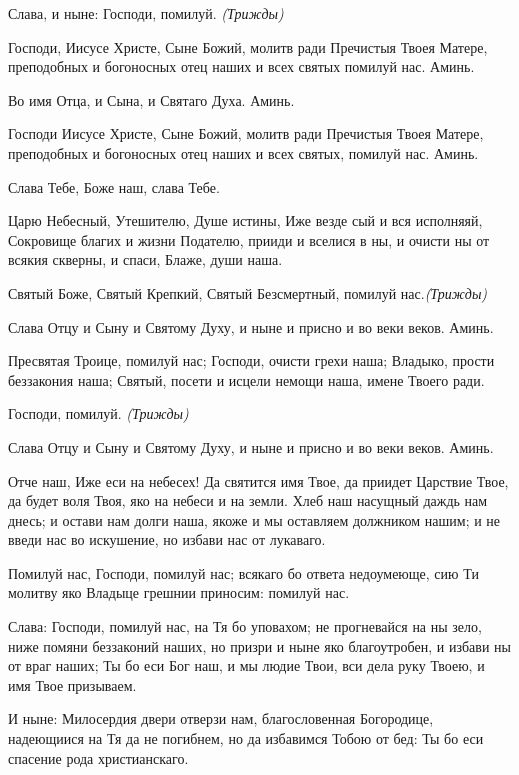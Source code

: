 Слава, и ныне: Господи, помилуй. \itshape (Трижды)\normalfont{}

Господи, Иисусе Христе, Сыне Божий, молитв ради Пречистыя Твоея Матере, преподобных и богоносных отец наших и всех святых помилуй нас. Аминь.
\longpage\mychapterending[1]

 
Во имя Отца, и Сына, и Святаго Духа. Аминь.


Господи Иисусе Христе, Сыне Божий, молитв ради Пречистыя Твоея Матере, преподобных и богоносных отец наших и всех святых, помилуй нас. Аминь.


Слава Тебе, Боже наш, слава Тебе.


Царю Небесный, Утешителю, Душе истины, Иже везде сый и вся исполняяй, Сокровище благих и жизни Подателю, прииди и вселися в ны, и очисти ны от всякия скверны, и спаси, Блаже, души наша.


Святый Боже, Святый Крепкий, Святый Безсмертный, помилуй нас.\itshape  (Трижды)\normalfont{}


Слава Отцу и Сыну и Святому Духу, и ныне и присно и во веки веков. Аминь.


Пресвятая Троице, помилуй нас; Господи, очисти грехи наша; Владыко, прости беззакония наша; Святый, посети и исцели немощи наша, имене Твоего ради.


Господи, помилуй. \itshape (Трижды)\normalfont{}


Слава Отцу и Сыну и Святому Духу, и ныне и присно и во веки веков. Аминь.





Отче наш, Иже еси на небесех! Да святится имя Твое, да приидет Царствие Твое, да будет воля Твоя, яко на небеси и на земли. Хлеб наш насущный даждь нам днесь; и остави нам долги наша, якоже и мы оставляем должником нашим; и не введи нас во искушение, но избави нас от лукаваго.




Помилуй нас, Господи, помилуй нас; всякаго бо ответа недоумеюще, сию Ти молитву яко Владыце грешнии приносим: помилуй нас.


Слава: Господи, помилуй нас, на Тя бо уповахом; не прогневайся на ны зело, ниже помяни беззаконий наших, но призри и ныне яко благоутробен, и избави ны от враг наших; Ты бо еси Бог наш, и мы людие Твои, вси дела руку Твоею, и имя Твое призываем.


И ныне: Милосердия двери отверзи нам, благословенная Богородице, надеющиися на Тя да не погибнем, но да избавимся Тобою от бед: Ты бо еси спасение рода христианскаго.


